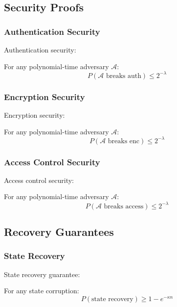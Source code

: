 \documentclass[12pt]{article}
\begin{document}
\subsection{Security Proofs}
\subsubsection{Authentication Security}
Authentication security:
\begin{theorem}
For any polynomial-time adversary $\mathcal{A}$:
\begin{equation}
P(\mathcal{A}\text{ breaks auth}) \leq 2^{-\lambda}
\end{equation}
\end{theorem}
\subsubsection{Encryption Security}
Encryption security:
\begin{theorem}
For any polynomial-time adversary $\mathcal{A}$:
\begin{equation}
P(\mathcal{A}\text{ breaks enc}) \leq 2^{-\lambda}
\end{equation}
\end{theorem}
\subsubsection{Access Control Security}
Access control security:
\begin{theorem}
For any polynomial-time adversary $\mathcal{A}$:
\begin{equation}
P(\mathcal{A}\text{ breaks access}) \leq 2^{-\lambda}
\end{equation}
\end{theorem}
\subsection{Recovery Guarantees}
\subsubsection{State Recovery}
State recovery guarantee:
\begin{theorem}
For any state corruption:
\begin{equation}
P(\text{state recovery}) \geq 1 - e^{-\kappa n}
\end{equation}
\end{theorem}
\end{document}
